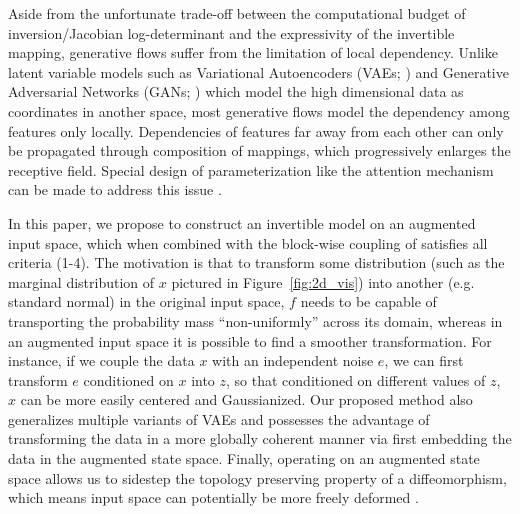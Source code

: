 \documentclass{article}
\begin{document}
Aside from the unfortunate trade-off between the computational budget of inversion/Jacobian log-determinant and the expressivity of the invertible mapping, generative flows suffer from the limitation of local dependency. 
Unlike latent variable models such as Variational Autoencoders (VAEs; \citealt{kingma2013auto, rezende2014stochastic}) and Generative Adversarial Networks (GANs; \citealt{goodfellow2014generative}) which model the high dimensional data as coordinates in another space, most generative flows model the dependency among features only locally. 
Dependencies of features far away from each other can only be propagated through composition of mappings, which progressively enlarges the receptive field. 
Special design of parameterization like the attention mechanism can be made to address this issue \citep{ho2019flow++}.

In this paper, we propose to construct an invertible model on an augmented input space, which when combined with the block-wise coupling of \citet{dinh2016density} satisfies all criteria (1-4). 
The motivation is that to transform some distribution (such as the marginal distribution of $x$ pictured in Figure~\ref{fig:2d_vis}) into another (e.g. standard normal) in the original input space, $f$ needs to be capable of transporting the probability mass ``non-uniformly'' across its domain, 
whereas in an augmented input space it is possible to find a smoother transformation.
For instance, if we couple the data $x$ with an independent noise $e$, we can first transform $e$ conditioned on $x$ into $z$, so that conditioned on different values of $z$, $x$ can be more easily centered and Gaussianized. 
Our proposed method also generalizes multiple variants of VAEs and possesses the advantage of transforming the data in a more globally coherent manner via first embedding the data in the augmented state space.
Finally, operating on an augmented state space allows us to sidestep the topology preserving property of a diffeomorphism, which means input space can potentially be more freely deformed \citep{dupont2019augmented}. 
\end{document}
